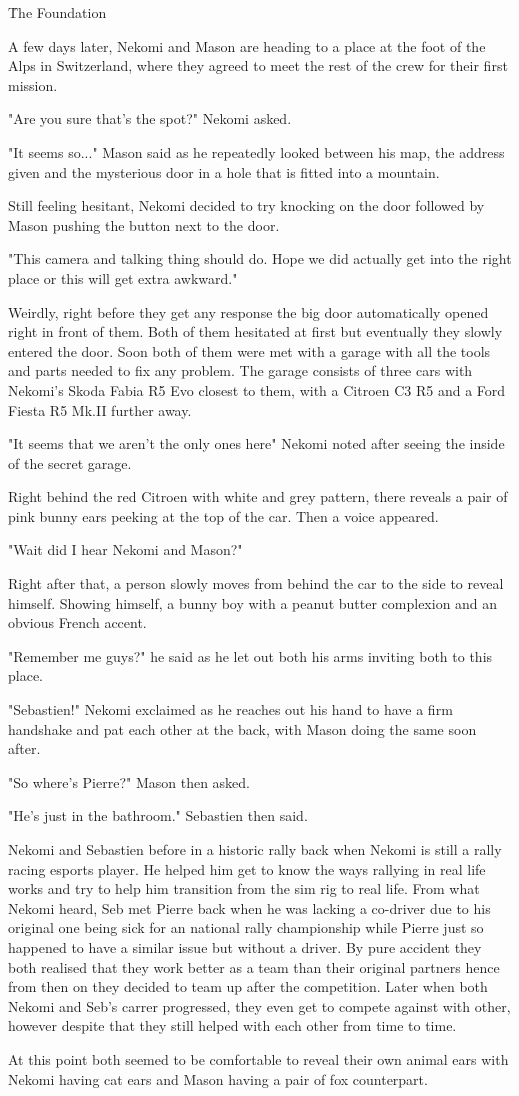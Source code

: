 \h{The Foundation}

A few days later, Nekomi and Mason are heading to a place at the foot of the Alps in Switzerland, where they agreed to meet the rest of the crew for their first mission. 

"Are you sure that's the spot?" Nekomi asked. 

"It seems so..." Mason said as he repeatedly looked between his map, the address given and the mysterious door in a hole that is fitted into a mountain. 

Still feeling hesitant, Nekomi decided to try knocking on the door followed by Mason pushing the button next to the door. 

"This camera and talking thing should do. Hope we did actually get into the right place or this will get extra awkward."

Weirdly, right before they get any response the big door automatically opened right in front of them. 
Both of them hesitated at first but eventually they slowly entered the door. 
Soon both of them were met with a garage with all the tools and parts needed to fix any problem. 
The garage consists of three cars with Nekomi's Skoda Fabia R5 Evo closest to them,  with a Citroen C3 R5 and a Ford Fiesta R5 Mk.II further away.

"It seems that we aren't the only ones here" Nekomi noted after seeing the inside of the secret garage. 

Right behind the red Citroen with white and grey pattern, there reveals a pair of pink bunny ears peeking at the top of the car. Then a voice appeared. 

"Wait did I hear Nekomi and Mason?" 

Right after that, a person slowly moves from behind the car to the side to reveal himself. 
Showing himself, a bunny boy with a peanut butter complexion and an obvious French accent. 

"Remember me guys?" he said as he let out both his arms inviting both to this place. 

"Sebastien!" Nekomi exclaimed as he reaches out his hand to have a firm handshake and pat each other at the back, with Mason doing the same soon after. 

"So where's Pierre?" Mason then asked. 

"He's just in the bathroom." Sebastien then said. 

Nekomi and Sebastien before in a historic rally back when Nekomi is still a rally racing esports player. He helped him get to know the ways rallying in real life works and try to help him transition from the sim rig to real life. 
From what Nekomi heard, Seb met Pierre back when he was lacking a co-driver due to his original one being sick for an national rally championship while Pierre just so happened to have a similar issue but without a driver. 
By pure accident they both realised that they work better as a team than their original partners hence from then on they decided to team up after the competition. 
Later when both Nekomi and Seb's carrer progressed, they even get to compete against with other, however despite that they still helped with each other from time to time. 

At this point both seemed to be comfortable to reveal their own animal ears with Nekomi having cat ears and Mason having a pair of fox counterpart. 
